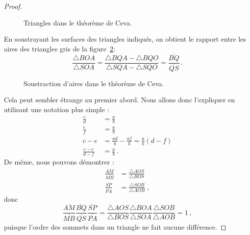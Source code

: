 \begin{proof}
\begin{figure}[th]
\caption{Triangles dans le théorème de Ceva.}\label{f.ceva2}
\end{figure}

En soustrayant les surfaces des triangles indiqués, on obtient le rapport entre les aires des triangles gris de la figure~\ref{f.ceva3}:
\[
\frac{\triangle BOA}{\triangle SOA}=\frac{\triangle BQA - \triangle BQO}{\triangle SQA-\triangle SQO} = \frac{\overline{BQ}}{\overline{QS}}\,.
\]


\begin{figure}[htbp]
\centering

\caption{Soustraction d'aires dans le théorème de Ceva.}\label{f.ceva3}
\end{figure}

Cela peut sembler étrange au premier abord. Nous allons donc l'expliquer en utilisant une notation plus simple :
\begin{align*}
 \frac{c}{d} &=\frac{a}{b}\\
 \frac{e}{f} &=\frac{a}{b}\\
c-e &= \frac{ad}{b} - \frac{af}{b}=\frac{a}{b}(d-f)\\
\frac{c-e}{d-f} &= \frac{a}{b}\,.
\end{align*}
De même, nous pouvons démontrer :
\begin{align*}
\frac{\overline{AM}}{\overline{MB}} &= \frac{\triangle AOS}{\triangle BOS}\\
\frac{\overline{SP}}{\overline{PA}} &=\frac{\triangle SOB}{\triangle AOB}\;,
\end{align*}
donc
\[
\frac{\overline{AM}}{\overline{MB}}\frac{\overline{BQ}}{\overline{QS}}\frac{\overline{SP}}{\overline{PA}} = \frac{\triangle AOS}{\triangle BOS}\frac{\triangle BOA}{\triangle SOA}\frac{\triangle SOB}{\triangle AOB}=1\,,
\]
puisque l'ordre des sommets dans un triangle ne fait aucune différence.
\end{proof}

